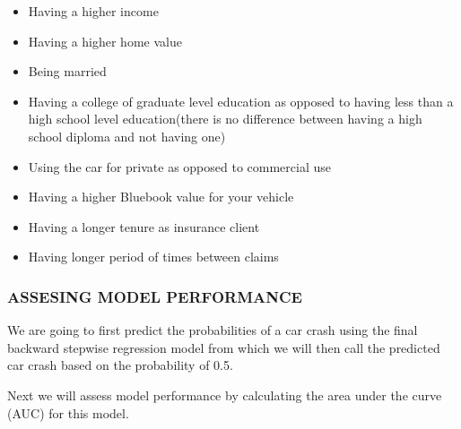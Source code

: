 \documentclass[
]{article}
\newenvironment{Shaded}{\begin{snugshade}}{\end{snugshade}}
\newcommand{\AttributeTok}[1]{\textcolor[rgb]{0.77,0.63,0.00}{#1}}
\newcommand{\DecValTok}[1]{\textcolor[rgb]{0.00,0.00,0.81}{#1}}
\newcommand{\FloatTok}[1]{\textcolor[rgb]{0.00,0.00,0.81}{#1}}
\newcommand{\FunctionTok}[1]{\textcolor[rgb]{0.00,0.00,0.00}{#1}}
\newcommand{\NormalTok}[1]{#1}
\newcommand{\OtherTok}[1]{\textcolor[rgb]{0.56,0.35,0.01}{#1}}
\newcommand{\SpecialCharTok}[1]{\textcolor[rgb]{0.00,0.00,0.00}{#1}}
\newcommand{\StringTok}[1]{\textcolor[rgb]{0.31,0.60,0.02}{#1}}
\providecommand{\tightlist}{%
  \setlength{\itemsep}{0pt}\setlength{\parskip}{0pt}}
\begin{document}
\begin{itemize}
\tightlist
\item
  Having a higher income
\item
  Having a higher home value
\item
  Being married
\item
  Having a college of graduate level education as opposed to having less
  than a high school level education(there is no difference between
  having a high school diploma and not having one)
\item
  Using the car for private as opposed to commercial use
\item
  Having a higher Bluebook value for your vehicle
\item
  Having a longer tenure as insurance client
\item
  Having longer period of times between claims
\end{itemize}

\hypertarget{assesing-model-performance}{%
\subsubsection{ASSESING MODEL
PERFORMANCE}\label{assesing-model-performance}}

We are going to first predict the probabilities of a car crash using the
final backward stepwise regression model from which we will then call
the predicted car crash based on the probability of 0.5.

\begin{Shaded}
\end{Shaded}

Next we will assess model performance by calculating the area under the
curve (AUC) for this model.
\end{document}
